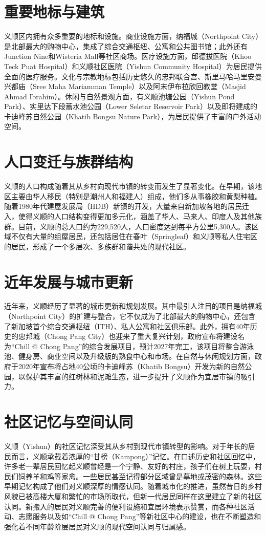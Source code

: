 \documentclass[11pt,a4paper,twoside,openany]{book}
\begin{document}
\section{重要地标与建筑}
义顺区内拥有众多重要的地标和设施。商业设施方面，纳福城（Northpoint City）是北部最大的购物中心，集成了综合交通枢纽、公寓和公共图书馆；此外还有Junction Nine和Wisteria Mall等社区商场。医疗设施方面，邱德拔医院（Khoo Teck Puat Hospital）和义顺社区医院（Yishun Community Hospital）为居民提供全面的医疗服务。文化与宗教地标包括历史悠久的忠邦联合宫、斯里马哈马里安曼兴都庙（Sree Maha Mariamman Temple）以及阿末伊布拉欣回教堂（Masjid Ahmad Ibrahim）。休闲与自然景观方面，有义顺池塘公园（Yishun Pond Park）、实里达下段蓄水池公园（Lower Seletar Reservoir Park）以及即将建成的卡迪峰苏自然公园（Khatib Bongsu Nature Park），为居民提供了丰富的户外活动空间。

\section{人口变迁与族群结构}
义顺的人口构成随着其从乡村向现代市镇的转变而发生了显著变化。在早期，该地区主要由华人移民（特别是潮州人和福建人）组成，他们多从事橡胶和黄梨种植。随着1980年代建屋发展局（HDB）新镇的开发，大量来自新加坡各地的居民迁入，使得义顺的人口结构变得更加多元化，涵盖了华人、马来人、印度人及其他族群。目前，义顺的总人口约为229,520人，人口密度达到每平方公里5,300人。该区域不仅有大量的组屋居民，还包括居住在春叶（Springleaf）和义顺等私人住宅区的居民，形成了一个多层次、多族群和谐共处的现代社区。

\section{近年发展与城市更新}
近年来，义顺经历了显著的城市更新和规划发展。其中最引人注目的项目是纳福城（Northpoint City）的扩建与整合，它不仅成为了北部最大的购物中心，还包含了新加坡首个综合交通枢纽（ITH）、私人公寓和社区俱乐部。此外，拥有40年历史的忠邦城（Chong Pang City）也迎来了重大复兴计划，政府宣布将建设名为“Chill @ Chong Pang”的综合发展项目，预计2027年完工，该项目将整合游泳池、健身房、商业空间以及升级版的熟食中心和市场。在自然与休闲规划方面，政府于2020年宣布将占地40公顷的卡迪峰苏（Khatib Bongsu）开发为新的自然公园，以保护其丰富的红树林和泥滩生态，进一步提升了义顺作为宜居市镇的吸引力。

\section{社区记忆与空间认同}
义顺（Yishun）的社区记忆深受其从乡村到现代市镇转型的影响。对于年长的居民而言，义顺承载着浓厚的“甘榜（Kampong）”记忆。在口述历史和社区回忆中，许多老一辈居民回忆起义顺曾经是一个宁静、友好的村庄，孩子们在树上玩耍，村民们饲养羊和鸡等家禽。一些居民甚至记得部分区域曾是墓地或茂密的森林。这些早期记忆构成了他们对义顺深厚的情感认同。随着城市化的推进，虽然昔日的乡村风貌已被高楼大厦和繁忙的市场所取代，但新一代居民同样在这里建立了新的社区认同。新搬入的居民对义顺完善的便利设施和宜居环境表示赞赏，而各种社区活动、志愿服务以及如“Chill @ Chong Pang”等新社区中心的建设，也在不断塑造和强化着不同年龄阶层居民对义顺的现代空间认同与归属感。
\end{document}
